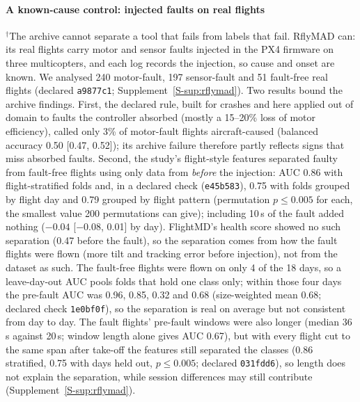 \documentclass[preprint,12pt]{elsarticle}
\begin{document}
\paragraph{A known-cause control: injected faults on real flights}
\label{sec:rflymad}
$^\dagger$The archive cannot separate a tool that fails from labels that fail. RflyMAD \cite{le2025rflymad} can: its real flights carry motor and sensor faults injected in the PX4 firmware on three multicopters, and each log records the injection, so cause and onset are known. We analysed 240 motor-fault, 197 sensor-fault and 51 fault-free real flights (declared \texttt{a9877c1}; Supplement~\ref{S-sup:rflymad}). Two results bound the archive findings. First, the declared rule, built for crashes and here applied out of domain to faults the controller absorbed (mostly a 15--20\% loss of motor efficiency), called only 3\% of motor-fault flights aircraft-caused (balanced accuracy 0.50 [0.47, 0.52]); its archive failure therefore partly reflects signs that miss absorbed faults. Second, the study's flight-style features separated faulty from fault-free flights using only data from \emph{before} the injection: AUC 0.86 with flight-stratified folds and, in a declared check (\texttt{e45b583}), 0.75 with folds grouped by flight day and 0.79 grouped by flight pattern (permutation $p\le0.005$ for each, the smallest value 200 permutations can give); including 10\,s of the fault added nothing ($-0.04$ [$-0.08$, 0.01] by day). FlightMD's health score showed no such separation (0.47 before the fault), so the separation comes from how the fault flights were flown (more tilt and tracking error before injection), not from the dataset as such. The fault-free flights were flown on only 4 of the 18 days, so a leave-day-out AUC pools folds that hold one class only; within those four days the pre-fault AUC was 0.96, 0.85, 0.32 and 0.68 (size-weighted mean 0.68; declared check \texttt{1e0bf0f}), so the separation is real on average but not consistent from day to day. The fault flights' pre-fault windows were also longer (median 36\,s against 20\,s; window length alone gives AUC 0.67), but with every flight cut to the same span after take-off the features still separated the classes (0.86 stratified, 0.75 with days held out, $p\le0.005$; declared \texttt{031fdd6}), so length does not explain the separation, while session differences may still contribute (Supplement~\ref{S-sup:rflymad}).
\end{document}
